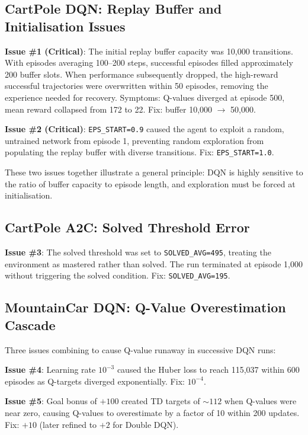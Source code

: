 \documentclass[a4paper,12pt]{article}
\begin{document}
\subsection{CartPole DQN: Replay Buffer and Initialisation Issues}

\textbf{Issue \#1 (Critical)}: The initial replay buffer capacity was 10,000 transitions. With episodes averaging 100--200 steps, successful episodes filled approximately 200 buffer slots. When performance subsequently dropped, the high-reward successful trajectories were overwritten within 50 episodes, removing the experience needed for recovery. Symptoms: Q-values diverged at episode 500, mean reward collapsed from 172 to 22. Fix: buffer 10,000 $\rightarrow$ 50,000.

\textbf{Issue \#2 (Critical)}: \texttt{EPS\_START=0.9} caused the agent to exploit a random, untrained network from episode 1, preventing random exploration from populating the replay buffer with diverse transitions. Fix: \texttt{EPS\_START=1.0}.

These two issues together illustrate a general principle: DQN is highly sensitive to the ratio of buffer capacity to episode length, and exploration must be forced at initialisation.

\subsection{CartPole A2C: Solved Threshold Error}

\textbf{Issue \#3}: The solved threshold was set to \texttt{SOLVED\_AVG=495}, treating the environment as mastered rather than solved. The run terminated at episode 1,000 without triggering the solved condition. Fix: \texttt{SOLVED\_AVG=195}.

\subsection{MountainCar DQN: Q-Value Overestimation Cascade}
\label{sec:dqn_bugs}

Three issues combining to cause Q-value runaway in successive DQN runs:

\textbf{Issue \#4}: Learning rate $10^{-3}$ caused the Huber loss to reach 115,037 within 600 episodes as Q-targets diverged exponentially. Fix: $10^{-4}$.

\textbf{Issue \#5}: Goal bonus of $+100$ created TD targets of $\sim112$ when Q-values were near zero, causing Q-values to overestimate by a factor of 10 within 200 updates. Fix: $+10$ (later refined to $+2$ for Double DQN).
\end{document}
